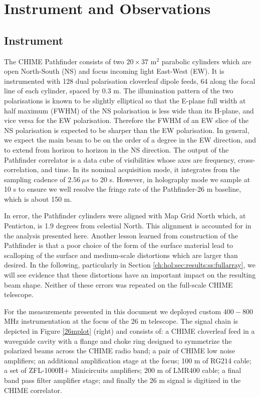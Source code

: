 \section{Instrument and Observations} \label{ch:hol:sec:io}

\subsection{Instrument} \label{ch:hol:sec:io:ss:i}

The CHIME Pathfinder\citep{chimepath1} consists of two $20\times37$ m$^2$ parabolic cylinders which are open North-South (NS) and focus incoming light East-West (EW). It is instrumented with 128 dual polarisation cloverleaf dipole feeds\citep{meiling}, 64 along the focal line of each cylinder, spaced by $0.3$ m. The illumination pattern of the two polarisations is known to be slightly elliptical so that the E-plane full width at half maximum (FWHM) of the NS polarisation is less wide than its H-plane, and vice versa for the EW polarisation. Therefore the FWHM of an EW slice of the NS polarisation is expected to be sharper than the EW polarisation. In general, we expect the main beam to be on the order of a degree in the EW direction, and to extend from horizon to horizon in the NS direction. The output of the Pathfinder correlator is a data cube of visibilities whose axes are frequency, cross-correlation, and time. In its nominal acquisition mode, it integrates from the sampling cadence of $2.56~\mu s$ to 20 s. However, in holography mode we sample at 10 s to ensure we well resolve the fringe rate of the Pathfinder-26 m baseline, which is about 150 m.

In error, the Pathfinder cylinders were aligned with Map Grid North which, at Penticton, is 1.9 degrees from celestial North. This alignment is accounted for in the analysis presented here. Another lesson learned from construction of the Pathfinder is that a poor choice of the form of the surface material lead to scalloping of the surface and medium-scale distortions which are larger than desired. In the following, particularly in Section \ref{ch:hol:sec:results:ss:fullarray}, we will see evidence that these distortions have an important impact on the resulting beam shape. Neither of these errors was repeated on the full-scale CHIME telescope.

For the measurements presented in this document we deployed custom $400-800$ MHz instrumentation at the focus of the 26 m telescope. The signal chain is depicted in Figure \ref{26mplot} (right) and consists of: a CHIME cloverleaf feed in a waveguide cavity with a flange and choke ring designed to symmetrize the polarized beams across the CHIME radio band; a pair of CHIME low noise amplifiers; an additional amplification stage at the focus; 100 m of RG214 cable; a set of ZFL-1000H+ Minicircuits amplifiers; 200 m of LMR400 cable; a final band pass filter amplifier stage; and finally the 26 m signal is digitized in the CHIME correlator.

